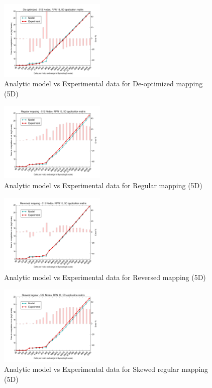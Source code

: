 \documentclass{acm_proc_article-sp}
\begin{document}
\begin{figure}
  \center
  \includegraphics[width=0.45\textwidth]{mappings/5d_pessimal.png}
  \caption{Analytic model vs Experimental data for De-optimized mapping (5D)}
    \label{fig:5D_pessimal_mapping}
\end{figure}

\begin{figure}
  \center
  \includegraphics[width=0.45\textwidth]{mappings/5d_regular_model.png}
  \caption{Analytic model vs Experimental data for Regular mapping (5D)}
    \label{fig:5D_regular_mapping}
\end{figure}

\begin{figure}
  \center
  \includegraphics[width=0.45\textwidth]{mappings/5d_reversed_model.png}
  \caption{Analytic model vs Experimental data for Reversed mapping (5D)}
    \label{fig:5D_reversed_mapping}
\end{figure}

\begin{figure}
  \center
  \includegraphics[width=0.45\textwidth]{mappings/5d_skewed_regular.png}
  \caption{Analytic model vs Experimental data for Skewed regular mapping (5D)}
    \label{fig:5D_skewed_regular_mapping}
\end{figure}
\end{document}
